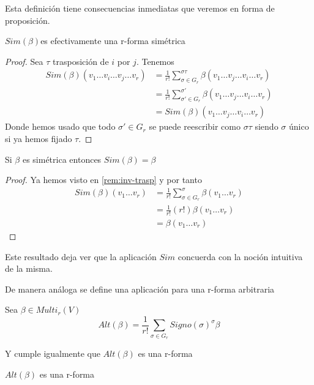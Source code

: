 \documentclass[../VD.tex]{subfiles}
\begin{document}
Esta definición tiene consecuencias inmediatas que veremos en forma de proposición.

\begin{proposition}
\( Sim(\beta) \)es efectivamente una r-forma simétrica
\end{proposition}

\begin{proof}
Sea \( \tau \) trasposición de \( i \) por \( j \). Tenemos
\begin{align*}
Sim(\beta)(v_1\ldots v_i\ldots v_j\ldots v_r)&=\frac{1}{r!}\sum_{\sigma\in G_r}^{\sigma\tau}\beta (v_1\ldots v_j\ldots v_i\ldots v_r)\\
&=\frac{1}{r!}\sum_{\sigma'\in G_r}^{\sigma'}\beta(v_1\ldots v_j\ldots v_i\ldots v_r)\\
&=Sim(\beta)(v_1\ldots v_j\ldots v_i\ldots v_r)
\end{align*}
Donde hemos usado que todo \( \sigma'\in G_r \) se puede reescribir como \( \sigma \tau \) siendo \( \sigma \) único si ya hemos fijado \( \tau \).
\end{proof}

\begin{proposition}
Si \( \beta \) es simétrica entonces \( Sim(\beta)=\beta \)
\end{proposition}

\begin{proof}
Ya hemos visto en \ref{rem:inv-trasp} y por tanto
\begin{align*}
Sim(\beta)(v_1\ldots v_r)&=\frac{1}{r!}\sum_{\sigma\in G_r}^\sigma\beta(v_1\ldots v_r)\\
&=\frac{1}{r!}(r!)\beta(v_1\ldots v_r)\\
&=\beta(v_1\ldots v_r)
\end{align*}
\end{proof}

Este resultado deja ver que la aplicación \( Sim \) concuerda con la noción intuitiva de la misma.

De manera análoga se define una aplicación para una r-forma arbitraria
\begin{definition} 
Sea \( \beta\in Multi_r(V) \)
\[
Alt(\beta)=\frac{1}{r!}\sum_{\sigma\in G_r}Signo(\sigma) ^\sigma\beta
\]
\end{definition}

Y cumple igualmente  que \( Alt(\beta) \) es una r-forma

\begin{proposition}
\( Alt(\beta) \) es una r-forma
\end{proposition}
\end{document}
